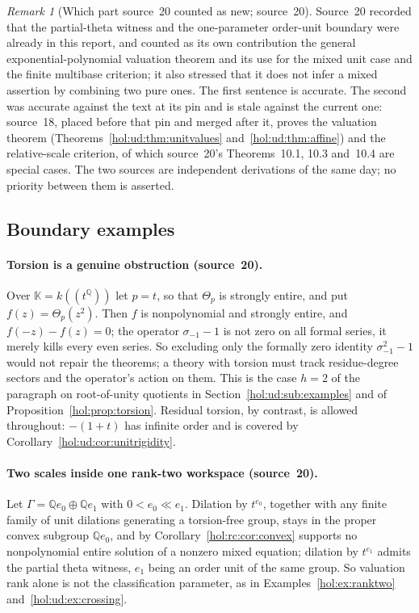 \documentclass[11pt]{article}
\numberwithin{equation}{section}
\theoremstyle{definition}
\theoremstyle{remark}
\newtheorem{remark}[theorem]{Remark}
\newcommand{\Q}{\mathbb Q}
\newcommand{\KK}{\mathbb K}
\begin{document}
\begin{remark}[Which part source~20 counted as new; source~20]
\label{hol:rc:rem:stale}
Source~20 recorded that the partial-theta witness and the one-parameter
order-unit boundary were already in this report, and counted as its own
contribution the general exponential-polynomial valuation theorem and its use
for the mixed unit case and the finite multibase criterion; it also stressed
that it does not infer a mixed assertion by combining two pure ones. The
first sentence is accurate. The second was accurate against the text at its
pin and is stale against the current one: source~18, placed before that pin
and merged after it, proves the valuation theorem
(Theorems~\ref{hol:ud:thm:unitvalues} and~\ref{hol:ud:thm:affine}) and the
relative-scale criterion, of which source~20's Theorems~10.1, 10.3 and~10.4
are special cases. The two sources are independent derivations of the same
day; no priority between them is asserted.
\end{remark}

\subsection{Boundary examples}\label{hol:rc:sub:boundaries}

\paragraph{Torsion is a genuine obstruction (source~20).}
Over $\KK=k((t^\Q))$ let $p=t$, so that $\Theta_p$ is strongly entire, and put
$f(z)=\Theta_p(z^2)$. Then $f$ is nonpolynomial and strongly entire, and
$f(-z)-f(z)=0$; the operator $\sigma_{-1}-1$ is not zero on all formal series,
it merely kills every even series. So excluding only the formally zero
identity $\sigma_{-1}^2-1$ would not repair the theorems; a theory with torsion
must track residue-degree sectors and the operator's action on them. This is
the case $h=2$ of the paragraph on root-of-unity quotients in
Section~\ref{hol:ud:sub:examples} and of Proposition~\ref{hol:prop:torsion}.
Residual torsion, by contrast, is allowed throughout: $-(1+t)$ has infinite
order and is covered by Corollary~\ref{hol:ud:cor:unitrigidity}.

\paragraph{Two scales inside one rank-two workspace (source~20).}
Let $\Gamma=\Q e_0\oplus\Q e_1$ with $0<e_0\ll e_1$. Dilation by $t^{e_0}$,
together with any finite family of unit dilations generating a torsion-free
group, stays in the proper convex subgroup $\Q e_0$, and by
Corollary~\ref{hol:rc:cor:convex} supports no nonpolynomial entire solution of
a nonzero mixed equation; dilation by $t^{e_1}$ admits the partial theta
witness, $e_1$ being an order unit of the same group. So valuation rank alone
is not the classification parameter, as in Examples~\ref{hol:ex:ranktwo}
and~\ref{hol:ud:ex:crossing}.
\end{document}
